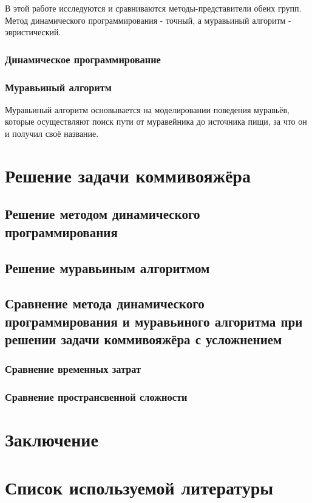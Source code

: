 В этой работе исследуются и сравниваются методы-представители обеих групп. Метод динамического программирования - точный, а муравьиный алгоритм - эвристический.

\subsubsection{Динамическое программирование}
\subsubsection{Муравьиный алгоритм}

Муравьиный алгоритм основывается на моделировании поведения муравьёв, которые осуществляют поиск пути от муравейника до источника пищи, за что он и получил своё название.


\section{Решение задачи коммивояжёра}
\subsection{Решение методом динамического программирования}
\subsection{Решение муравьиным алгоритмом}
\subsection{Сравнение метода динамического программирования и муравьиного алгоритма при решении задачи коммивояжёра с усложнением}
\subsubsection{Сравнение временных затрат}
\subsubsection{Сравнение пространсвенной сложности}
\section*{Заключение}

\newpage
\section*{Список используемой литературы}

